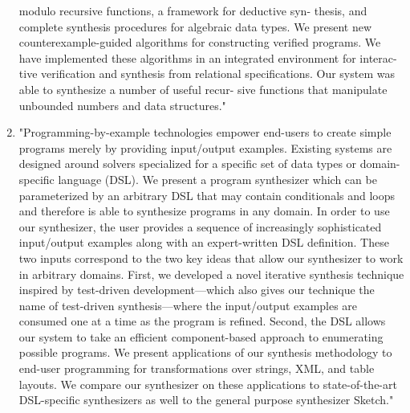 \begin{enumerate}
modulo recursive functions, a framework for deductive syn-
thesis, and complete synthesis procedures for algebraic data
types. We present new counterexample-guided algorithms
for constructing verified programs. We have implemented
these algorithms in an integrated environment for interac-
tive verification and synthesis from relational specifications.
Our system was able to synthesize a number of useful recur-
sive functions that manipulate unbounded numbers and data
structures."
\item \cite{Perelman:2014:TS:2594291.2594297} "Programming-by-example technologies empower end-users to create simple programs merely by providing input/output examples. Existing systems are designed around solvers specialized for a specific set of data types or domain-specific language (DSL). We present a program synthesizer which can be parameterized by an arbitrary DSL that may contain conditionals and loops and therefore is able to synthesize programs in any domain. In order to use our synthesizer, the user provides a sequence of increasingly sophisticated input/output examples along with an expert-written DSL definition. These two inputs correspond to the two key ideas that allow our synthesizer to work in arbitrary domains. First, we developed a novel iterative synthesis technique inspired by test-driven development---which also gives our technique the name of test-driven synthesis---where the input/output examples are consumed one at a time as the program is refined. Second, the DSL allows our system to take an efficient component-based approach to enumerating possible programs. We present applications of our synthesis methodology to end-user programming for transformations over strings, XML, and table layouts. We compare our synthesizer on these applications to state-of-the-art DSL-specific synthesizers as well to the general purpose synthesizer Sketch."

\end{enumerate}
